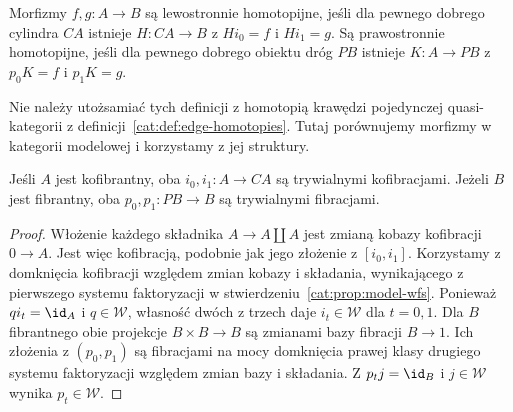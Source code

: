 \begin{definicja}\label{cat:def:model-homotopies}
Morfizmy $f,g:A\to B$ są lewostronnie homotopijne, jeśli dla pewnego dobrego cylindra $CA$ istnieje $H:CA\to B$ z $Hi_0=f$ i $Hi_1=g$. Są prawostronnie homotopijne, jeśli dla pewnego dobrego obiektu dróg $PB$ istnieje $K:A\to PB$ z $p_0K=f$ i $p_1K=g$.
\end{definicja}
Nie należy utożsamiać tych definicji z homotopią krawędzi pojedynczej quasi-kategorii z definicji~\ref{cat:def:edge-homotopies}. Tutaj porównujemy morfizmy w kategorii modelowej i korzystamy z jej struktury.

\begin{lemat}\label{cat:lem:model-cylinder-endpoints}
Jeśli $A$ jest kofibrantny, oba $i_0,i_1:A\to CA$ są trywialnymi kofibracjami. Jeżeli $B$ jest fibrantny, oba $p_0,p_1:PB\to B$ są trywialnymi fibracjami.
\end{lemat}
\begin{proof}
Włożenie każdego składnika $A\to A\amalg A$ jest zmianą kobazy kofibracji $0\to A$. Jest więc kofibracją, podobnie jak jego złożenie z $[i_0,i_1]$. Korzystamy z domknięcia kofibracji względem zmian kobazy i składania, wynikającego z pierwszego systemu faktoryzacji w stwierdzeniu~\ref{cat:prop:model-wfs}. Ponieważ $qi_t=\id_A$ i $q\in\mathcal W$, własność dwóch z trzech daje $i_t\in\mathcal W$ dla $t=0,1$.
Dla $B$ fibrantnego obie projekcje $B\times B\to B$ są zmianami bazy fibracji $B\to1$. Ich złożenia z $(p_0,p_1)$ są fibracjami na mocy domknięcia prawej klasy drugiego systemu faktoryzacji względem zmian bazy i składania. Z $p_tj=\id_B$ i $j\in\mathcal W$ wynika $p_t\in\mathcal W$.
\end{proof}

